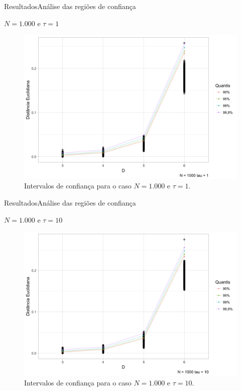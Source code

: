 \documentclass[10pt,xcolor={dvipsnames}]{beamer}
\begin{document}
\begin{frame}{Resultados}{Análise das regiões de confiança}
\begin{block}{$N=1.000$ e $\tau=1$}
	\begin{figure}
		\centering
		\includegraphics[width=.7\linewidth]{Conf_Int_1k_T1_noMT}
		\caption{Intervalos de confiança para o caso $N=1.000$ e $\tau=1$.}\label{Fig:Conf_Int_1k_T1}
	\end{figure}
	
\end{block}
\end{frame}

\begin{frame}{Resultados}{Análise das regiões de confiança}
	\begin{block}{$N=1.000$ e $\tau=10$}
	\begin{figure}
		\centering
		\includegraphics[width=.7\linewidth]{Conf_Int_1k_T10_noMT}
		\caption{Intervalos de confiança para o caso $N=1.000$ e $\tau=10$.}\label{Fig:Conf_Int_1k_T10}
	\end{figure}	
	\end{block}
\end{frame}
\end{document}
